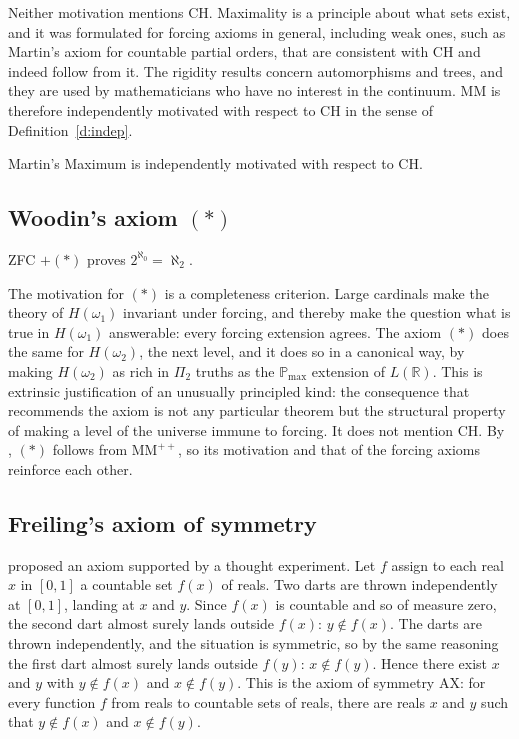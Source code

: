 \documentclass{situationist-preprint}
\begin{document}
Neither motivation mentions CH. Maximality is a principle about what sets exist, and it was formulated for forcing axioms in general, including weak ones, such as Martin's axiom for countable partial orders, that are consistent with CH and indeed follow from it. The rigidity results concern automorphisms and trees, and they are used by mathematicians who have no interest in the continuum. MM is therefore independently motivated with respect to CH in the sense of Definition~\ref{d:indep}.

\begin{assumption}\label{a:mmmot}
Martin's Maximum is independently motivated with respect to CH.
\end{assumption}

\subsection{Woodin's axiom $(*)$}\label{s:star}

\begin{lemma}\label{l:star}
ZFC $+ (*)$ proves $2^{\aleph_0} = \aleph_2$.
\end{lemma}

The motivation for $(*)$ is a completeness criterion. Large cardinals make the theory of $H(\omega_1)$ invariant under forcing, and thereby make the question what is true in $H(\omega_1)$ answerable: every forcing extension agrees. The axiom $(*)$ does the same for $H(\omega_2)$, the next level, and it does so in a canonical way, by making $H(\omega_2)$ as rich in $\Pi_2$ truths as the $\mathbb{P}_{\max}$ extension of $L(\mathbb{R})$. This is extrinsic justification of an unusually principled kind: the consequence that recommends the axiom is not any particular theorem but the structural property of making a level of the universe immune to forcing. It does not mention CH. By \citet{AsperoSchindler2021}, $(*)$ follows from $\mathrm{MM}^{++}$, so its motivation and that of the forcing axioms reinforce each other.

\subsection{Freiling's axiom of symmetry}\label{s:freiling}

\citet{Freiling1986} proposed an axiom supported by a thought experiment. Let $f$ assign to each real $x$ in $[0,1]$ a countable set $f(x)$ of reals. Two darts are thrown independently at $[0,1]$, landing at $x$ and $y$. Since $f(x)$ is countable and so of measure zero, the second dart almost surely lands outside $f(x)$: $y \notin f(x)$. The darts are thrown independently, and the situation is symmetric, so by the same reasoning the first dart almost surely lands outside $f(y)$: $x \notin f(y)$. Hence there exist $x$ and $y$ with $y \notin f(x)$ and $x \notin f(y)$. This is the axiom of symmetry $\mathrm{AX}$: for every function $f$ from reals to countable sets of reals, there are reals $x$ and $y$ such that $y \notin f(x)$ and $x \notin f(y)$.
\end{document}
